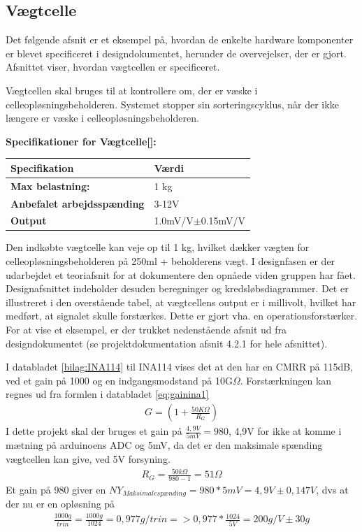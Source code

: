 \subsection{Vægtcelle}
Det følgende afsnit er et eksempel på, hvordan de enkelte hardware komponenter er blevet specificeret i designdokumentet, herunder de overvejelser, der er gjort. Afsnittet viser, hvordan vægtcellen er specificeret.

\label{subsec:loadcell}
Vægtcellen skal bruges til at kontrollere om, der er væske i celleopløsningsbeholderen. Systemet stopper sin sorteringscyklus, når der ikke længere er væske i celleopløsningsbeholderen.

\textbf{Specifikationer for Vægtcelle[\citet{DH7}]:} 
\begin{center}
		\begin{longtable}{ | m{6.5cm} | m{6.5cm}| } 
			\hline
			\textbf{Specifikation} &\textbf{Værdi} \\ 
			\hline
			\textbf{Max belastning:} & 1 kg \\ 
			\hline
			\textbf{Anbefalet arbejdsspænding} & 3-12V \\ 
			\hline
			\textbf{Output} & 1.0mV/V$\pm$0.15mV/V \\ 
			\hline
		\end{longtable}
\end{center}

Den indkøbte vægtcelle kan veje op til 1 kg, hvilket dækker vægten for celleopløsningsbeholderen på 250ml + beholderens vægt. I designfasen er der udarbejdet et teoriafsnit for at dokumentere den opnåede viden gruppen har fået. Designafsnittet indeholder desuden beregninger og kredsløbsdiagrammer. Det er illustreret i den overstående tabel, at vægtcellens output er i millivolt, hvilket har medført, at signalet skulle forstærkes. Dette er gjort vha. en operationsforstærker. For at vise et eksempel, er der trukket nedenstående afsnit ud fra designdokumentet (se projektdokumentation afsnit 4.2.1  for hele afsnittet).

I databladet \ref{bilag:INA114} til INA114 vises det at den har en CMRR på 115dB, ved et gain på 1000 og en indgangsmodstand på 10G$\Omega$. Forstærkningen kan regnes ud fra formlen i databladet \ref{eq:gainina1}
\begin{align}
 G=(1+\frac{50K\Omega}{R_{G}})
 \label{eq:gainina1}
 \end{align} 
 I dette projekt skal der bruges et gain på $\frac{4,9V}{5mV}=980$, 4,9V for ikke at komme i mætning på arduinoens ADC og 5mV, da det er den maksimale spænding vægtcellen kan give, ved 5V forsyning.
 \begin{align}
 R_{G}=\frac{50k\Omega}{980-1}=51\Omega
 \label{eq:gainina2}
 \end{align}
Et gain på 980 giver en $NY_{Maksimalespænding}=980*5mV=4,9V \pm0,147V$, dvs at der nu er en opløsning på
\begin{align}
 \frac{1000g}{trin}=\frac{1000g}{1024}=0,977g/trin=>0,977*\frac{1024}{5V}=200g/V \pm30g
 \label{eq:gainina3}
 \end{align}
 
